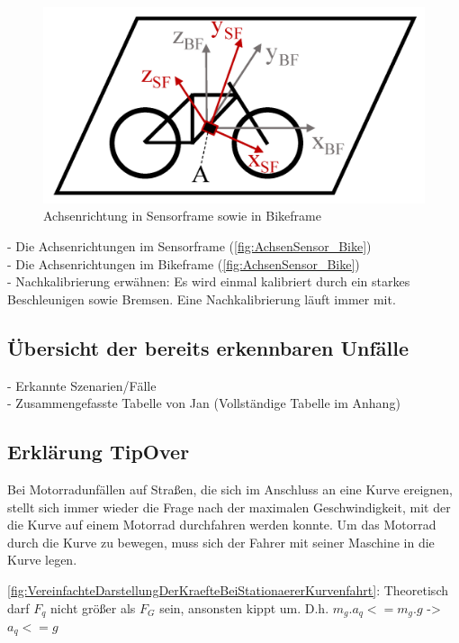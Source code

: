 \begin{figure}[H]
	\centering
	\includegraphics[width=0.7\linewidth]{Bilder/AchsenSensor_Bike.png}
	\caption{Achsenrichtung in Sensorframe sowie in Bikeframe \cite{SchneeCorrection2020}}
	\label{fig:AchsenSensor_Bike}
\end{figure}


- Die Achsenrichtungen im Sensorframe (\autoref{fig:AchsenSensor_Bike})\\

- Die Achsenrichtungen im Bikeframe (\autoref{fig:AchsenSensor_Bike})\\

- Nachkalibrierung erwähnen: Es wird einmal kalibriert durch ein starkes Beschleunigen sowie Bremsen. Eine Nachkalibrierung läuft immer mit.


\subsection{Übersicht der bereits erkennbaren Unfälle}

- Erkannte Szenarien/Fälle\\

- Zusammengefasste Tabelle von Jan (Vollständige Tabelle im Anhang)


\subsection{Erklärung TipOver} %
%
%
%
%
Bei Motorradunfällen auf Straßen, die sich im Anschluss an eine Kurve ereignen, stellt sich immer wieder die Frage nach der maximalen Geschwindigkeit, mit der die Kurve auf einem Motorrad durchfahren werden konnte.
Um das Motorrad durch die Kurve zu bewegen, muss sich der Fahrer mit seiner Maschine in die Kurve legen.


\autoref{fig:VereinfachteDarstellungDerKraefteBeiStationaererKurvenfahrt}: Theoretisch darf $F_q$ nicht größer als $F_G$ sein, ansonsten kippt um. D.h. $m_g . a_q < = m_g . g$ ->  $a_q <= g$ \\

